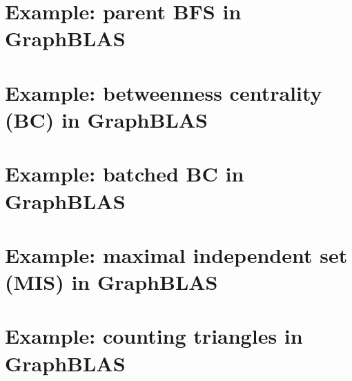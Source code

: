 \pagebreak
\nolinenumbers
\section{Example: parent BFS in GraphBLAS}
{\scriptsize

}
\vfill

\pagebreak
\nolinenumbers
\section{Example: betweenness centrality (BC) in GraphBLAS}
\label{App:BCnobatch}
{\scriptsize

}
\vfill

\pagebreak
\nolinenumbers
\section{Example: batched BC in GraphBLAS}
{\scriptsize

}
\vfill

\pagebreak
\nolinenumbers
\section{Example: maximal independent set (MIS) in GraphBLAS}
{\scriptsize

}
\vfill

\pagebreak
\nolinenumbers
\section{Example: counting triangles in GraphBLAS}
{\scriptsize

}
\vfill
\pagebreak

\linenumbers
